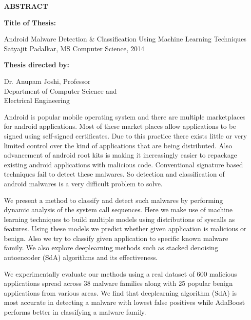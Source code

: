\newpage
\pagestyle{empty}

\begin{center}
\vspace{0.1in}
\large{\bf ABSTRACT} \par  
\bigskip \bigskip
\end{center}

{\bf Title of Thesis:} \parbox[t]{4.5in}{{Android Malware Detection \& Classification Using Machine Learning Techniques\\
Satyajit Padalkar, MS Computer Science, 2014\\}}
\begin{singlespace}
{\bf Thesis directed by:}{\hspace{2.5mm}} \parbox[t]{3in}{Dr. Anupam Joshi, Professor \\
Department of Computer Science and \\ Electrical Engineering\\}
\end{singlespace}

Android is popular mobile operating system and there are multiple marketplaces for android applications. Most of these market places allow applications to be signed using self-signed certificates. Due to this practice there exists little or very limited control over the kind of applications that are being distributed. Also advancement of android root kits is making it increasingly easier to repackage existing android applications with malicious code. Conventional signature based techniques fail to detect these malwares. So detection and classification of android malwares is a very difficult problem to solve.

We present a method to classify and detect such malwares by performing dynamic analysis of the system call sequences. Here we make use of machine learning techniques to build multiple models using distributions of syscalls as features. Using these models we predict whether given application is malicious or benign. Also we try to classify given application to specific known malware family. We also explore deeplearning methods such as stacked denoising autoencoder (SdA) algorithms and its effectiveness.

We experimentally evaluate our methods using a real dataset of 600 malicious applications spread across 38 malware families along with 25 popular benign applications from various areas. We find that deeplearning algorithm (SdA) is most accurate in detecting a malware with lowest false positives while AdaBoost performs better in classifying a malware family.

\par\vfil


